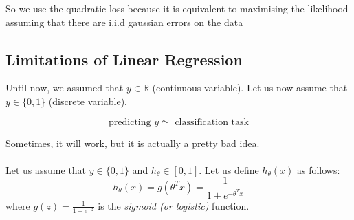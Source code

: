 \documentclass{article}
\begin{document}
So we use the quadratic loss because it is equivalent to maximising the likelihood assuming that there are i.i.d gaussian errors on the data






\subsection{Limitations of Linear Regression}
Until now, we assumed that $y\in \mathbb{R}$ (continuous variable). Let us now assume that $y \in \{0,1\}$ (discrete variable).

\[\text{predicting }y \simeq \text{ classification task}\]

Sometimes, it will work, but it is actually a pretty bad idea.
\bigskip	

\paragraph{} Let us assume that $y\in \{0,1\}$ and $h_{\theta} \in [0,1]$. Let us define $h_\theta(x)$ as follows:
\[h_{\theta}(x)=g(\theta^Tx)=\frac{1}{1+e^{-\theta^Tx}}\]
where $g(z)=\frac{1}{1+e^{-z}}$ is the \emph{sigmoid (or logistic)} function.
\end{document}
